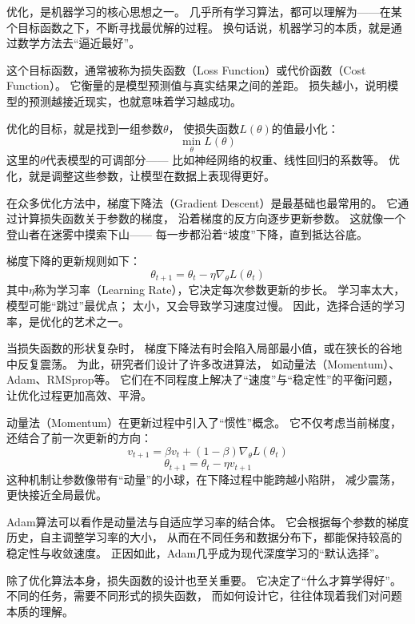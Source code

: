 优化，是机器学习的核心思想之一。  
几乎所有学习算法，都可以理解为——在某个目标函数之下，不断寻找最优解的过程。  
换句话说，机器学习的本质，就是通过数学方法去“逼近最好”。



这个目标函数，通常被称为损失函数（Loss Function）或代价函数（Cost Function）。  
它衡量的是模型预测值与真实结果之间的差距。  
损失越小，说明模型的预测越接近现实，也就意味着学习越成功。



优化的目标，就是找到一组参数$\theta$，  
使损失函数$L(\theta)$的值最小化：
$$
\min_{\theta} L(\theta)
$$  
这里的$\theta$代表模型的可调部分——  
比如神经网络的权重、线性回归的系数等。  
优化，就是调整这些参数，让模型在数据上表现得更好。



在众多优化方法中，梯度下降法（Gradient Descent）是最基础也最常用的。  
它通过计算损失函数关于参数的梯度，  
沿着梯度的反方向逐步更新参数。  
这就像一个登山者在迷雾中摸索下山——  
每一步都沿着“坡度”下降，直到抵达谷底。



梯度下降的更新规则如下：
$$
\theta_{t+1} = \theta_t - \eta \nabla_\theta L(\theta_t)
$$  
其中$\eta$称为学习率（Learning Rate），它决定每次参数更新的步长。  
学习率太大，模型可能“跳过”最优点；  
太小，又会导致学习速度过慢。  
因此，选择合适的学习率，是优化的艺术之一。



当损失函数的形状复杂时，  
梯度下降法有时会陷入局部最小值，或在狭长的谷地中反复震荡。  
为此，研究者们设计了许多改进算法，  
如动量法（Momentum）、Adam、RMSprop等。  
它们在不同程度上解决了“速度”与“稳定性”的平衡问题，  
让优化过程更加高效、平滑。



动量法（Momentum）在更新过程中引入了“惯性”概念。  
它不仅考虑当前梯度，还结合了前一次更新的方向：  
$$
v_{t+1} = \beta v_t + (1 - \beta) \nabla_\theta L(\theta_t)
$$  
$$
\theta_{t+1} = \theta_t - \eta v_{t+1}
$$  
这种机制让参数像带有“动量”的小球，在下降过程中能跨越小陷阱，  
减少震荡，更快接近全局最优。



Adam算法可以看作是动量法与自适应学习率的结合体。  
它会根据每个参数的梯度历史，自主调整学习率的大小，  
从而在不同任务和数据分布下，都能保持较高的稳定性与收敛速度。  
正因如此，Adam几乎成为现代深度学习的“默认选择”。



除了优化算法本身，损失函数的设计也至关重要。  
它决定了“什么才算学得好”。  
不同的任务，需要不同形式的损失函数，  
而如何设计它，往往体现着我们对问题本质的理解。



